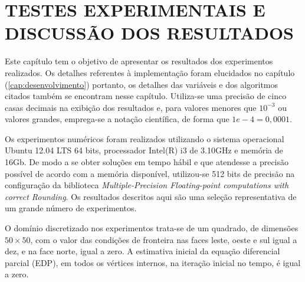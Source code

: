 \section{TESTES EXPERIMENTAIS E DISCUSSÃO DOS RESULTADOS}
\label{cap:resultados}

Este capítulo tem o objetivo de apresentar os resultados dos experimentos realizados. Os detalhes referentes à implementação foram elucidados no capítulo (\ref{cap:desenvolvimento}) portanto, os detalhes das variáveis e dos algoritmos citados também se encontram nesse capítulo. Utiliza-se uma precisão de cinco casas decimais na exibição dos resultados e, para valores menores que $10^{-3}$ ou valores grandes, emprega-se a notação científica, de forma que $1e-4 = 0,0001$.

Os experimentos numéricos foram realizados utilizando o sistema operacional Ubuntu 12.04 LTS 64 bits, processador Intel(R) i3 de 3.10GHz e memória de 16Gb. De modo a se obter soluções em tempo hábil e que atendesse a precisão possível de acordo com a memória disponível, utilizou-se 512 bits de precisão na configuração da biblioteca {\it Multiple-Precision Floating-point computations with correct Rounding}. Os resultados descritos aqui são uma seleção representativa de um grande número de experimentos.

O domínio discretizado nos experimentos trata-se de um quadrado, de dimensões $50 \times 50$, com o valor das condições de fronteira nas faces leste, oeste e sul igual a dez, e na face norte, igual a zero. A estimativa inicial da equação diferencial parcial (EDP), em todos os vértices internos, na iteração inicial no tempo, é igual a zero. 

